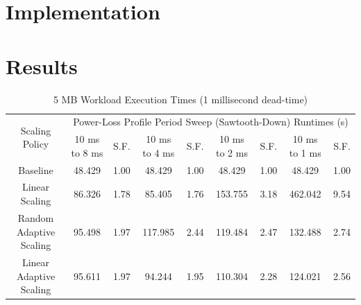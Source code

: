 \documentclass[journal, twoside]{IEEEtran}
\begin{document}
\lipsum[4]

\section{Implementation}

\lipsum[2]

\section{Results}

\lipsum[4]


\begin{table}
    \renewcommand{\arraystretch}{1.3} %
    \caption{5 MB Workload Execution Times (1 millisecond dead-time)}
    \label{main-workload-results-1ms}
    \centering
    \begin{tabular}{c||c|c|c|c|c|c|c|c}
        \hline
        \multirow{2}{*}{Scaling Policy} & \multicolumn{8}{c}{Power-Loss Profile Period Sweep (Sawtooth-Down) Runtimes (s)} \\\cline{2-9}
        {} & {10 ms to 8 ms} & {S.F.} & {10 ms to 4 ms} & {S.F.} & {10 ms to 2 ms} & {S.F.} & {10 ms to 1 ms} & {S.F.} \\
        \hline
        \hline
        {Baseline}                  & {48.429} & {1.00} & {48.429}  & {1.00} & {48.429}  & {1.00} & {48.429}  & {1.00}\\
        {Linear Scaling}            & {86.326} & {1.78} & {85.405}  & {1.76} & {153.755} & {3.18} & {462.042} & {9.54}\\
        {Random Adaptive Scaling}   & {95.498} & {1.97} & {117.985} & {2.44} & {119.484} & {2.47} & {132.488} & {2.74}\\
        {Linear Adaptive Scaling}   & {95.611} & {1.97} & {94.244}  & {1.95} & {110.304} & {2.28} & {124.021} & {2.56}\\
        \hline
    \end{tabular}
\end{table}
\end{document}
